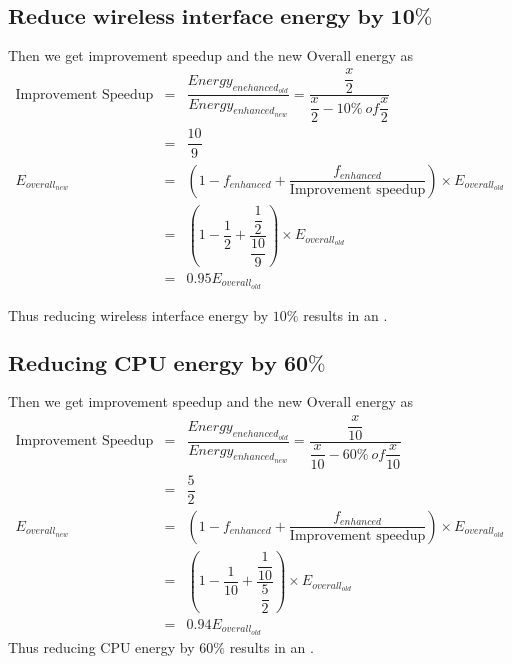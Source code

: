 \documentclass{tufte-handout}
\begin{document}
	  \subsection{$\textbf{Reduce wireless interface energy by 10\%}$}
	  	Then we get improvement speedup and the new Overall energy as
		\begin{eqnarray*}
			\mbox{Improvement Speedup} &=& \dfrac{Energy_{enehanced_{old}}}{Energy_{enhanced_{new}}} = \dfrac{\dfrac{x}{2}}{\dfrac{x}{2} - 10\%\ of \dfrac{x}{2}}\\
			&=& \dfrac{10}{9} \\
			E_{overall_{new}} &=& (1 - f_{enhanced} + \dfrac{f_{enhanced}}{\mbox{Improvement speedup}}) \times E_{overall_{old}} \\
			&=& ( 1 - \dfrac{1}{2} + \dfrac{\dfrac{1}{2}}{\dfrac{10}{9}})\times E_{overall_{old}} \\
			&=& 0.95 E_{overall_{old}}
		\end{eqnarray*}

		Thus reducing wireless interface energy by $10\%$ results in an .

	  \subsection{$\textbf{Reducing CPU energy by 60\%}$}
	  	Then we get improvement speedup and the new Overall energy as
		\begin{eqnarray*}
			\mbox{Improvement Speedup} &=& \dfrac{Energy_{enehanced_{old}}}{Energy_{enhanced_{new}}} = \dfrac{\dfrac{x}{10}}{\dfrac{x}{10} - 60\%\ of \dfrac{x}{10}}\\
			&=& \dfrac{5}{2} \\
			E_{overall_{new}} &=& (1 - f_{enhanced} + \dfrac{f_{enhanced}}{\mbox{Improvement speedup}}) \times E_{overall_{old}} \\
			&=& ( 1 - \dfrac{1}{10} + \dfrac{\dfrac{1}{10}}{\dfrac{5}{2}})\times E_{overall_{old}} \\
			&=& 0.94 E_{overall_{old}}
		\end{eqnarray*}
		Thus reducing CPU energy by $60\%$ results in an .
\end{document}
